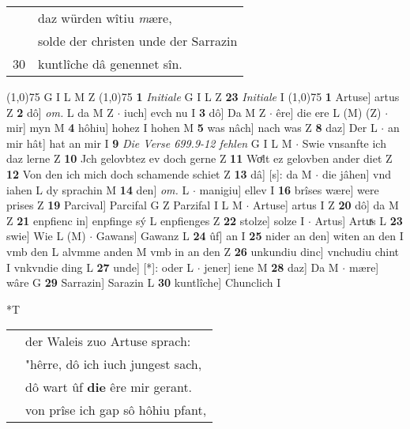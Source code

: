 \documentclass[8pt,a4paper,notitlepage]{article}
\begin{document}
\begin{table}[ht]
\begin{minipage}[t]{0.5\linewidth}
\begin{tabular}{rl}
 & daz würden wîtiu \textit{m}ære,\\ 
 & solde der christen unde der Sarrazin\\ 
30 & kuntlîche dâ genennet sîn.\\ 
\end{tabular}
\scriptsize
\line(1,0){75} \newline
G I L M Z \newline
\line(1,0){75} \newline
\textbf{1} \textit{Initiale} G I L Z  \textbf{23} \textit{Initiale} I  \newline
\line(1,0){75} \newline
\textbf{1} Artuse] artus Z \textbf{2} dô] \textit{om.} L da M Z  $\cdot$ iuch] evch nu I \textbf{3} dô] Da M Z  $\cdot$ êre] die ere L (M) (Z)  $\cdot$ mir] myn M \textbf{4} hôhiu] hohez I hohen M \textbf{5} was nâch] nach was Z \textbf{8} daz] Der L  $\cdot$ an mir hât] hat an mir I \textbf{9} \textit{Die Verse 699.9-12 fehlen} G I L M   $\cdot$ Swie vnsanfte ich daz lerne Z \textbf{10} Jch gelovbtez ev doch gerne Z \textbf{11} Woͤlt ez gelovben ander diet Z \textbf{12} Von den ich mich doch schamende schiet Z \textbf{13} dâ] [s]: da M  $\cdot$ die jâhen] vnd iahen L dy sprachin M \textbf{14} den] \textit{om.} L  $\cdot$ manigiu] ellev I \textbf{16} brîses wære] were prises Z \textbf{19} Parcival] Parcifal G Z Parzifal I L M  $\cdot$ Artuse] artus I Z \textbf{20} dô] da M Z \textbf{21} enpfienc in] enpfinge sý L enpfienges Z \textbf{22} stolze] solze I  $\cdot$ Artus] Artuͯs L \textbf{23} swie] Wie L (M)  $\cdot$ Gawans] Gawanz L \textbf{24} ûf] an I \textbf{25} nider an den] witen an den I vmb den L alvmme anden M vmb in an den Z \textbf{26} unkundiu dinc] vnchudiu chint I vnkvndie ding L \textbf{27} unde] [*]: oder L  $\cdot$ jener] iene M \textbf{28} daz] Da M  $\cdot$ mære] wâre G \textbf{29} Sarrazin] Sarazin L \textbf{30} kuntlîche] Chunclich I \newline
\end{minipage}
\hspace{0.5cm}
\begin{minipage}[t]{0.5\linewidth}
\small
\begin{center}*T
\end{center}
\begin{tabular}{rl}
 & der Waleis zuo Artuse sprach:\\ 
 & "hêrre, dô ich iuch jungest sach,\\ 
 & dô wart ûf \textbf{die} êre mir gerant.\\ 
 & von prîse ich gap sô hôhiu pfant,\\ 

\end{tabular}
\end{minipage}
\end{table}
\end{document}
